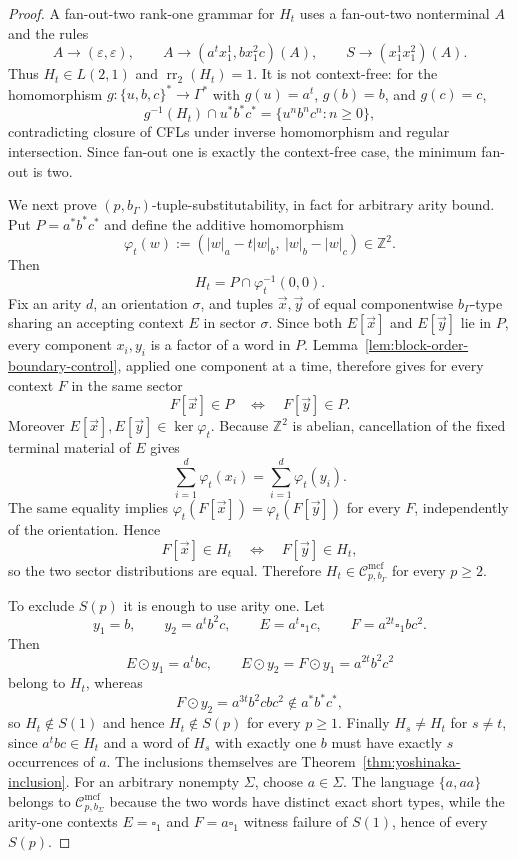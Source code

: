 \documentclass[11pt,a4paper]{article}
\numberwithin{equation}{section}
\theoremstyle{plain}
\theoremstyle{definition}
\theoremstyle{remark}
\newcommand{\Cmcf}[2]{\mathcal{C}^{\mathrm{mcf}}_{#1,#2}}
\newcommand{\tuple}[1]{\vec{#1}}
\newcommand{\blank}{\square}
\newcommand{\eps}{\varepsilon}
\begin{document}
\begin{proof}
A fan-out-two rank-one grammar for $H_t$ uses a fan-out-two nonterminal $A$
and the rules
\[
  A\to(\eps,\eps),\qquad
  A\to(a^t x_1^1,bx_1^2c)(A),\qquad
  S\to(x_1^1x_1^2)(A).
\]
Thus $H_t\in L(2,1)$ and $\operatorname{rr}_2(H_t)=1$.  It is not
context-free: for the homomorphism
$g:\{u,b,c\}^*\to\Gamma^*$ with
$g(u)=a^t$, $g(b)=b$, and $g(c)=c$,
\[
  g^{-1}(H_t)\cap u^*b^*c^*=\{u^nb^nc^n:n\ge0\},
\]
contradicting closure of CFLs under inverse homomorphism and regular
intersection.  Since fan-out one is exactly the context-free case, the
minimum fan-out is two.

We next prove $(p,b_\Gamma)$-tuple-substitutability, in fact for arbitrary
arity bound.  Put $P=a^*b^*c^*$ and define the additive homomorphism
\[
  \varphi_t(w):=(|w|_a-t|w|_b,\ |w|_b-|w|_c)\in\mathbb Z^2.
\]
Then
\[
  H_t=P\cap\varphi_t^{-1}(0,0).
\]
Fix an arity $d$, an orientation $\sigma$, and tuples
$\tuple x,\tuple y$ of equal componentwise $b_\Gamma$-type sharing an
accepting context $E$ in sector $\sigma$.  Since both $E[\tuple x]$ and
$E[\tuple y]$ lie in $P$, every component $x_i,y_i$ is a factor of a word in
$P$.  Lemma~\ref{lem:block-order-boundary-control}, applied one component at a
time, therefore gives for every context $F$ in the same sector
\[
  F[\tuple x]\in P\quad\Longleftrightarrow\quad F[\tuple y]\in P.
\]
Moreover $E[\tuple x],E[\tuple y]\in\ker\varphi_t$.  Because $\mathbb Z^2$
is abelian, cancellation of the fixed terminal material of $E$ gives
\[
  \sum_{i=1}^d\varphi_t(x_i)=
  \sum_{i=1}^d\varphi_t(y_i).
\]
The same equality implies
$\varphi_t(F[\tuple x])=\varphi_t(F[\tuple y])$ for every $F$, independently
of the orientation.  Hence
\[
  F[\tuple x]\in H_t\quad\Longleftrightarrow\quad F[\tuple y]\in H_t,
\]
so the two sector distributions are equal.  Therefore
$H_t\in\Cmcf{p}{b_\Gamma}$ for every $p\ge2$.

To exclude $S(p)$ it is enough to use arity one.  Let
\[
  y_1=b,\qquad y_2=a^tb^2c,
  \qquad E=a^t\blank_1c,
  \qquad F=a^{2t}\blank_1bc^2.
\]
Then
\[
  E\odot y_1=a^tbc,\qquad
  E\odot y_2=F\odot y_1=a^{2t}b^2c^2
\]
belong to $H_t$, whereas
\[
  F\odot y_2=a^{3t}b^2cbc^2\notin a^*b^*c^*,
\]
so $H_t\notin S(1)$ and hence $H_t\notin S(p)$ for every $p\ge1$.
Finally $H_s\ne H_t$ for $s\ne t$, since $a^tbc\in H_t$ and a word of
$H_s$ with exactly one $b$ must have exactly $s$ occurrences of $a$.
The inclusions themselves are Theorem~\ref{thm:yoshinaka-inclusion}.  For an
arbitrary nonempty $\Sigma$, choose $a\in\Sigma$.  The language $\{a,aa\}$
belongs to $\Cmcf{p}{b_\Sigma}$ because the two words have distinct exact
short types, while the arity-one contexts $E=\blank_1$ and
$F=a\blank_1$ witness failure of $S(1)$, hence of every $S(p)$.
\end{proof}
\end{document}

